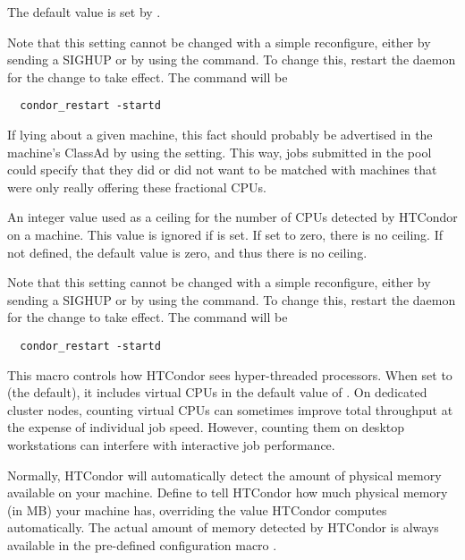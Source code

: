 \begin{description}
  The default value is set by .

  Note that this setting cannot be changed with a simple reconfigure, 
  either by sending a SIGHUP or by using the  command.
  To change this, restart the  daemon for the
  change to take effect. The command will be
\begin{verbatim}
  condor_restart -startd
\end{verbatim}

  If lying about a given machine, 
  this fact should probably be advertised in the machine's ClassAd
  by using the  setting.
  This way, jobs submitted in the pool could specify that they did or
  did not want to be matched with machines that were only really
  offering these fractional CPUs.

\label{param:MaxNumCpus}
\item[\Macro{MAX\_NUM\_CPUS}]
  An integer value used as a ceiling for the number of CPUs detected
  by HTCondor on a machine.
  This value is ignored if  is set.
  If set to zero, there is no ceiling. 
  If not defined, the default value is zero, and thus there is no ceiling. 

  Note that this setting cannot be changed with a simple reconfigure, 
  either by sending a SIGHUP or by using the  command.
  To change this, restart the  daemon for the
  change to take effect. The command will be
\begin{verbatim}
  condor_restart -startd
\end{verbatim}

\label{param:CountHyperthreadCpus}
\item[\Macro{COUNT\_HYPERTHREAD\_CPUS}]
  This macro controls how HTCondor sees hyper-threaded
  processors. When set to  (the default), it includes virtual CPUs in
  the default value of . On dedicated cluster nodes, 
  counting virtual CPUs can sometimes improve total throughput at the expense 
  of individual job speed. However, counting them on desktop workstations can
  interfere with interactive job performance.

\label{param:Memory}
\item[\Macro{MEMORY}]
  Normally, HTCondor will automatically detect the amount of physical
  memory available on your machine.  Define  to tell
  HTCondor how much physical memory (in MB) your machine has, overriding
  the value HTCondor computes automatically.  The actual amount of memory
  detected by HTCondor is always available in the pre-defined configuration
  macro .


\end{description}
